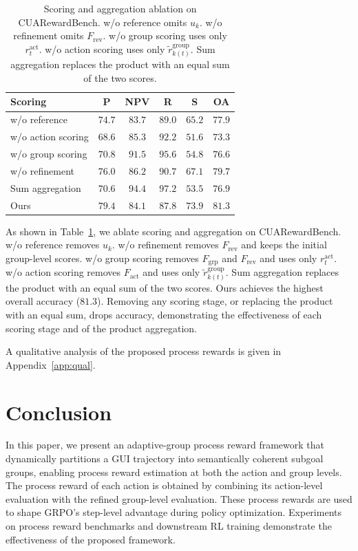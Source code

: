\begin{table}[t]
\caption{Scoring and aggregation ablation on CUARewardBench. w/o reference omits $u_k$. w/o refinement omits $F_{\mathrm{rev}}$. w/o group scoring uses only $r_t^{\mathrm{act}}$. w/o action scoring uses only $\tilde{r}_{k(t)}^{\mathrm{group}}$. Sum aggregation replaces the product with an equal sum of the two scores.}
\label{tab:ablation-scoring}
\centering
\small
\begin{tabular}{lccccc}
\toprule
Scoring & P & NPV & R & S & OA \\
\midrule
w/o reference & $74.7$ & $83.7$ & $89.0$ & $65.2$ & $77.9$ \\
w/o action scoring & $68.6$ & $85.3$ & $92.2$ & $51.6$ & $73.3$ \\
w/o group scoring & $70.8$ & $91.5$ & $95.6$ & $54.8$ & $76.6$ \\
w/o refinement & $76.0$ & $86.2$ & $90.7$ & $67.1$ & $79.7$ \\
Sum aggregation & $70.6$ & $\mathbf{94.4}$ & $\mathbf{97.2}$ & $53.5$ & $76.9$ \\
Ours & $\mathbf{79.4}$ & $84.1$ & $87.8$ & $\mathbf{73.9}$ & $\mathbf{81.3}$ \\
\bottomrule
\end{tabular}
\end{table}

As shown in Table~\ref{tab:ablation-scoring}, we ablate scoring and aggregation on CUARewardBench. w/o reference removes $u_k$. w/o refinement removes $F_{\mathrm{rev}}$ and keeps the initial group-level scores. w/o group scoring removes $F_{\mathrm{grp}}$ and $F_{\mathrm{rev}}$ and uses only $r_t^{\mathrm{act}}$. w/o action scoring removes $F_{\mathrm{act}}$ and uses only $\tilde{r}_{k(t)}^{\mathrm{group}}$. Sum aggregation replaces the product with an equal sum of the two scores. Ours achieves the highest overall accuracy ($81.3$). Removing any scoring stage, or replacing the product with an equal sum, drops accuracy, demonstrating the effectiveness of each scoring stage and of the product aggregation.

A qualitative analysis of the proposed process rewards is given in Appendix~\ref{app:qual}.

\section{Conclusion}
\label{sec:conclusion}

In this paper, we present an adaptive-group process reward framework that dynamically partitions a GUI trajectory into semantically coherent subgoal groups, enabling process reward estimation at both the action and group levels. The process reward of each action is obtained by combining its action-level evaluation with the refined group-level evaluation. These process rewards are used to shape GRPO's step-level advantage during policy optimization. Experiments on process reward benchmarks and downstream RL training demonstrate the effectiveness of the proposed framework.
